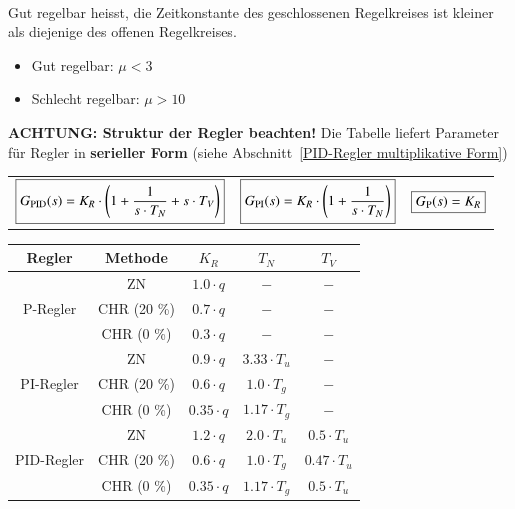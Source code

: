 \textbf{} \\
Gut regelbar heisst, die Zeitkonstante des geschlossenen Regelkreises ist kleiner als diejenige des offenen Regelkreises.

\begin{itemize}
    \item Gut regelbar: $\mu < 3$
    \item Schlecht regelbar: $\mu > 10$
\end{itemize}

\vspace{0.1cm}

\textbf{ACHTUNG: Struktur der Regler beachten!} Die Tabelle liefert Parameter für Regler in \textbf{serieller Form}
(siehe Abschnitt~\ref{PID-Regler multiplikative Form}) 

\begin{tabular}{c c c }
    $ \boxed{ G_{\rm PID}(s) = K_R \cdot \Bigg( 1 + \frac{1}{s \cdot T_N} + s \cdot T_V \Bigg) }$ & 
    $ \boxed{ G_{\rm PI}(s) = K_R \cdot \Bigg( 1 + \frac{1}{s \cdot T_N} \Bigg) }$ &
    $ \boxed{ G_{\rm P}(s) = K_R }$ 
\end{tabular}

\begin{center}
    \begin{tabular}{|c | c | c | c | c|}
        \toprule
        Regler      & Methode       & $K_R$             & $T_N$                 & $T_V$             \\
        \midrule
                    & ZN            & $1.0 \cdot q$     & $-$                   & $-$               \\
        P-Regler    & CHR (20 \%)   & $0.7 \cdot q$     & $-$                   & $-$               \\
                    & CHR (0 \%)    & $0.3 \cdot q$     & $-$                   & $-$               \\
        \midrule
                    & ZN            & $0.9 \cdot q$     & $3.33 \cdot T_u$      & $-$               \\
        PI-Regler   & CHR (20 \%)   & $0.6 \cdot q$     & $1.0 \cdot T_g$       & $-$               \\
                    & CHR (0 \%)    & $0.35 \cdot q$    & $1.17 \cdot T_g$      & $-$               \\
        \midrule
                    & ZN            & $1.2 \cdot q$     & $2.0 \cdot T_u$       & $0.5 \cdot T_u$   \\
        PID-Regler  & CHR (20 \%)   & $0.6 \cdot q$     & $1.0 \cdot T_g$       & $0.47 \cdot T_u$  \\
                    & CHR (0 \%)    & $0.35 \cdot q$    & $1.17 \cdot T_g$      & $0.5 \cdot T_u$   \\
        \bottomrule
    \end{tabular}
\end{center}

